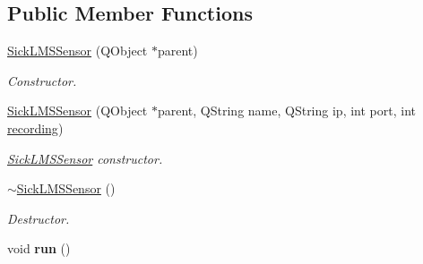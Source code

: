 \subsection*{Public Member Functions}
\begin{DoxyCompactItemize}
\item 
\hypertarget{classpacpus_1_1SickLMSSensor_a9e87f9cb5fd8c978af8d2633d98c0405}{\hyperlink{classpacpus_1_1SickLMSSensor_a9e87f9cb5fd8c978af8d2633d98c0405}{Sick\-L\-M\-S\-Sensor} (Q\-Object $\ast$parent)}\label{classpacpus_1_1SickLMSSensor_a9e87f9cb5fd8c978af8d2633d98c0405}

\begin{DoxyCompactList}\small\item\em Constructor. \end{DoxyCompactList}\item 
\hyperlink{classpacpus_1_1SickLMSSensor_ad1e27ae5fb0421011f3f6bf464f7e42c}{Sick\-L\-M\-S\-Sensor} (Q\-Object $\ast$parent, Q\-String name, Q\-String ip, int port, int \hyperlink{classpacpus_1_1AbstractSickSensor_a2cefb63d92089cab86f874a3390acb28}{recording})
\begin{DoxyCompactList}\small\item\em \hyperlink{classpacpus_1_1SickLMSSensor}{Sick\-L\-M\-S\-Sensor} constructor. \end{DoxyCompactList}\item 
\hypertarget{classpacpus_1_1SickLMSSensor_a557fadfe7ac1a08f9d2ee2d88cc66a61}{\hyperlink{classpacpus_1_1SickLMSSensor_a557fadfe7ac1a08f9d2ee2d88cc66a61}{$\sim$\-Sick\-L\-M\-S\-Sensor} ()}\label{classpacpus_1_1SickLMSSensor_a557fadfe7ac1a08f9d2ee2d88cc66a61}

\begin{DoxyCompactList}\small\item\em Destructor. \end{DoxyCompactList}\item 
\hypertarget{classpacpus_1_1SickLMSSensor_ab598fdcee13cb01624dfd806e524afac}{void {\bfseries run} ()}\label{classpacpus_1_1SickLMSSensor_ab598fdcee13cb01624dfd806e524afac}


\end{DoxyCompactItemize}
